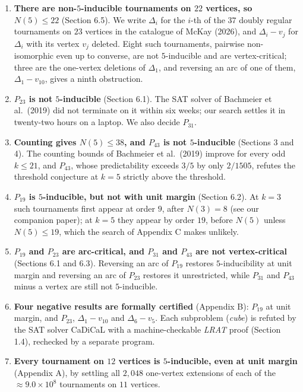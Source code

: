 \documentclass[
]{article}
\begin{document}
\begin{enumerate}
\def\labelenumi{\arabic{enumi}.}
\item
  \textbf{There are non-\(5\)-inducible tournaments on \(22\) vertices,
  so \(N(5) \le 22\)} (Section 6.5). We write \(\Delta_i\) for the
  \(i\)-th of the \(37\) doubly regular tournaments on \(23\) vertices
  in the catalogue of McKay (2026), and \(\Delta_i - v_j\) for
  \(\Delta_i\) with its vertex \(v_j\) deleted. Eight such tournaments,
  pairwise non-isomorphic even up to converse, are not \(5\)-inducible
  and are vertex-critical; three are the one-vertex deletions of
  \(\Delta_1\), and reversing an arc of one of them,
  \(\Delta_1 - v_{10}\), gives a ninth obstruction.
\item
  \textbf{\(P_{23}\) is not \(5\)-inducible} (Section 6.1). The SAT
  solver of Bachmeier et al.~(2019) did not terminate on it within six
  weeks; our search settles it in twenty-two hours on a laptop. We also
  decide \(P_{31}\).
\item
  \textbf{Counting gives \(N(5) \le 38\), and \(P_{43}\) is not
  \(5\)-inducible} (Sections 3 and 4). The counting bounds of Bachmeier
  et al.~(2019) improve for every odd \(k \le 21\), and \(P_{43}\),
  whose predictability exceeds \(3/5\) by only \(2/1505\), refutes the
  threshold conjecture at \(k = 5\) strictly above the threshold.
\item
  \textbf{\(P_{19}\) is \(5\)-inducible, but not with unit margin}
  (Section 6.2). At \(k = 3\) such tournaments first appear at order
  \(9\), after \(N(3) = 8\) (see our companion paper); at \(k = 5\) they
  appear by order \(19\), before \(N(5)\) unless \(N(5) \le 19\), which
  the search of Appendix C makes unlikely.
\item
  \textbf{\(P_{19}\) and \(P_{23}\) are arc-critical, and \(P_{31}\) and
  \(P_{43}\) are not vertex-critical} (Sections 6.1 and 6.3). Reversing
  an arc of \(P_{19}\) restores \(5\)-inducibility at unit margin and
  reversing an arc of \(P_{23}\) restores it unrestricted, while
  \(P_{31}\) and \(P_{43}\) minus a vertex are still not
  \(5\)-inducible.
\item
  \textbf{Four negative results are formally certified} (Appendix B):
  \(P_{19}\) at unit margin, and \(P_{23}\), \(\Delta_1 - v_{10}\) and
  \(\Delta_6 - v_{5}\). Each subproblem (\emph{cube}) is refuted by the
  SAT solver CaDiCaL with a machine-checkable \emph{LRAT} proof (Section
  1.4), rechecked by a separate program.
\item
  \textbf{Every tournament on \(12\) vertices is \(5\)-inducible, even
  at unit margin} (Appendix A), by settling all \(2{,}048\) one-vertex
  extensions of each of the \(\approx 9.0 \times 10^{8}\) tournaments on
  \(11\) vertices.
\end{enumerate}
\end{document}
